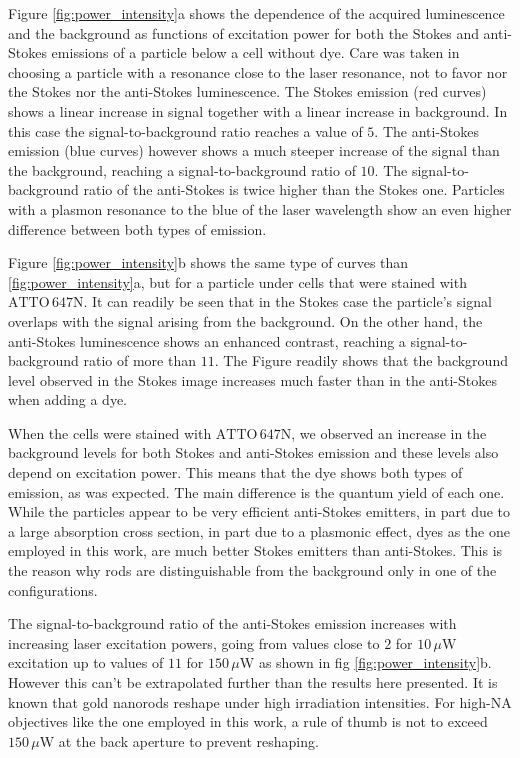 \documentclass[journal=nalefd,manuscript=letter]{achemso}
\newcommand{\uW}{\ensuremath{\,\mu\textrm{W}}}
\newcommand{\atto}{\ensuremath{\textrm{ATTO}\,647\textrm{N}}}
\begin{document}
Figure \ref{fig:power_intensity}a shows the dependence of the acquired
luminescence and the background as functions of excitation power for both the
Stokes and anti-Stokes emissions of a particle below a cell without dye. Care
was taken in choosing a particle with a resonance close to the laser resonance,
not to favor nor the Stokes nor the anti-Stokes luminescence. The Stokes
emission (red curves) shows a linear increase in signal together with a linear
increase in background. In this case the signal-to-background ratio reaches a
value of $5$. The anti-Stokes emission (blue curves) however shows a much
steeper increase of the signal than the background, reaching a
signal-to-background ratio of $10$. The signal-to-background ratio of the
anti-Stokes is twice higher than the Stokes one. Particles with a plasmon
resonance to the blue of the laser wavelength show an even higher difference
between both types of emission.

Figure \ref{fig:power_intensity}b shows the same type of curves than
\ref{fig:power_intensity}a, but for a particle under cells that were stained
with \atto. It can readily be seen that in the Stokes case the particle's signal
overlaps with the signal arising from the background. On the other hand, the
anti-Stokes luminescence shows an enhanced contrast, reaching a
signal-to-background ratio of more than $11$. The Figure readily shows that the
background level observed in the Stokes image increases much faster than in the
anti-Stokes when adding a dye. 

When the cells were stained with \atto, we observed an increase in the
background levels for both Stokes and anti-Stokes emission and these levels also
depend on excitation power. This means that the dye shows both types of
emission, as was expected. The main difference is the quantum yield of each one.
While the particles appear to be very efficient anti-Stokes emitters, in part
due to a large absorption cross section, in part due to a plasmonic effect, dyes as the one
employed in this work, are much better Stokes emitters than anti-Stokes. This is
the reason why rods are distinguishable from the background only in one of the
configurations.

The signal-to-background ratio of the anti-Stokes emission increases with
increasing laser excitation powers, going from values close to $2$ for $10\uW$
excitation up to values of $11$ for $150\uW$ as shown in fig
\ref{fig:power_intensity}b. However this can't be extrapolated further than the
results here presented. It is known that gold nanorods reshape under high
irradiation intensities. For high-NA objectives like the one employed in this
work, a rule of thumb is not to exceed $150\uW$ at the back aperture to prevent
reshaping.
\end{document}

